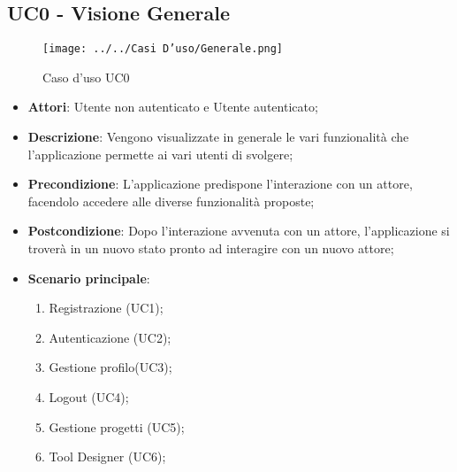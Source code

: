 \subsection{UC0 - Visione Generale} 
\label{ssec:UC0} 
\begin{figure}[h!] 
\centering 
\texttt{[image: ../../Casi D'uso/Generale.png]} 
\caption{Caso d'uso UC0} 
 \end{figure} 
\begin{itemize} 
\item \textbf{Attori}: Utente non autenticato e Utente autenticato;
\item \textbf{Descrizione}: Vengono visualizzate in generale le vari funzionalità che l'applicazione permette ai vari utenti di svolgere;
\item \textbf{Precondizione}: L'applicazione predispone l'interazione con un attore, facendolo accedere alle diverse funzionalità proposte;
\item \textbf{Postcondizione}: Dopo l'interazione avvenuta con un attore, l'applicazione si troverà in un nuovo stato pronto ad interagire con un nuovo attore;
\item \textbf{Scenario principale}: \begin{enumerate}\item Registrazione (UC1);\item Autenticazione (UC2);\item Gestione profilo(UC3);\item Logout (UC4);\item Gestione progetti (UC5);\item Tool Designer (UC6);
 \end{enumerate}
\end{itemize} 

